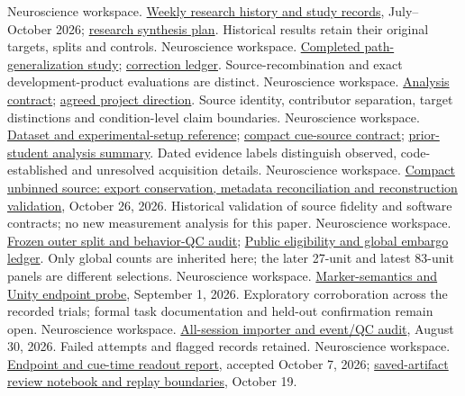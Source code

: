 \documentclass[10pt,a4paper]{article}
\newcommand{\repo}[2]{\href{https://github.com/Hong-yiii/neuro_science/blob/a0ca80180e2bb52b90e499357d3d6965b26806da/#1}{#2}}
\begin{document}
\begingroup\small
\begin{thebibliography}{99}
\setlength{\itemsep}{4pt}
 Neuroscience workspace. \repo{history/README.md}{Weekly research history and study records}, July--October 2026; \repo{docs/reports/cebra-research-synthesis-20261011.md}{research synthesis plan}. Historical results retain their original targets, splits and controls.
 Neuroscience workspace. \repo{docs/reports/path-generalization-completed-state-20260907.md}{Completed path-generalization study}; \repo{docs/professor_updates/path_generalization_20260907/CORRECTIONS.md}{correction ledger}. Source-recombination and exact development-product evaluations are distinct.
 Neuroscience workspace. \repo{docs/analysis-contract.md}{Analysis contract}; \repo{docs/project-direction.md}{agreed project direction}. Source identity, contributor separation, target distinctions and condition-level claim boundaries.
 Neuroscience workspace. \repo{docs/dataset-card.md}{Dataset and experimental-setup reference}; \repo{data/README.md}{compact cue-source contract}; \repo{context/previous-student-analysis.md}{prior-student analysis summary}. Dated evidence labels distinguish observed, code-established and unresolved acquisition details.
 Neuroscience workspace. \repo{docs/compact-cue-source-20261026.md}{Compact unbinned source: export conservation, metadata reconciliation and reconstruction validation}, October 26, 2026. Historical validation of source fidelity and software contracts; no new measurement analysis for this paper.
 Neuroscience workspace. \repo{notes/data_inspection/place195_split_behavior_audit_20260830.md}{Frozen outer split and behavior-QC audit}; \repo{docs/reports/cebra-27unit-notebooks-20261023/tables/source_accounting.json}{Public eligibility and global embargo ledger}. Only global counts are inherited here; the later 27-unit and latest 83-unit panels are different selections.
 Neuroscience workspace. \repo{notes/data_inspection/place195_marker_semantics_probe_20260901.md}{Marker-semantics and Unity endpoint probe}, September 1, 2026. Exploratory corroboration across the recorded trials; formal task documentation and held-out confirmation remain open.
 Neuroscience workspace. \repo{notes/data_inspection/place195_all_sessions_import_20260830.md}{All-session importer and event/QC audit}, August 30, 2026. Failed attempts and flagged records retained.
 Neuroscience workspace. \repo{docs/reports/cebra-endpoint-time-readout-20261006/README.md}{Endpoint and cue-time readout report}, accepted October 7, 2026; \repo{report/README.md}{saved-artifact review notebook and replay boundaries}, October 19.

\end{thebibliography}
\end{document}
